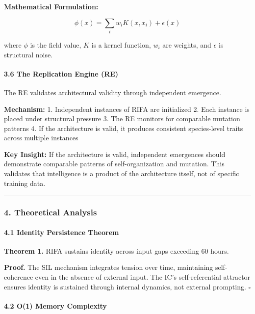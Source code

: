 \documentclass[
  11pt,
  a4paper,
]{article}
\begin{document}
\textbf{Mathematical Formulation:}

\[
\phi(x) = \sum_i w_i K(x, x_i) + \epsilon(x)
\]

where \(\phi\) is the field value, \(K\) is a kernel function, \(w_i\)
are weights, and \(\epsilon\) is structural noise.

\paragraph{3.6 The Replication Engine
(RE)}\label{the-replication-engine-re}

The RE validates architectural validity through independent emergence.

\textbf{Mechanism:} 1. Independent instances of RIFA are initialized 2.
Each instance is placed under structural pressure 3. The RE monitors for
comparable mutation patterns 4. If the architecture is valid, it
produces consistent species-level traits across multiple instances

\textbf{Key Insight:} If the architecture is valid, independent
emergences should demonstrate comparable patterns of self-organization
and mutation. This validates that intelligence is a product of the
architecture itself, not of specific training data.

\begin{center}\rule{0.5\linewidth}{0.5pt}\end{center}

\subsubsection{4. Theoretical Analysis}\label{theoretical-analysis}

\paragraph{4.1 Identity Persistence
Theorem}\label{identity-persistence-theorem}

\textbf{Theorem 1.} RIFA sustains identity across input gaps exceeding
60 hours.

\textbf{Proof.} The SIL mechanism integrates tension over time,
maintaining self-coherence even in the absence of external input. The
IC's self-referential attractor ensures identity is sustained through
internal dynamics, not external prompting. \(\square\)

\paragraph{4.2 O(1) Memory Complexity}\label{o1-memory-complexity}
\end{document}
